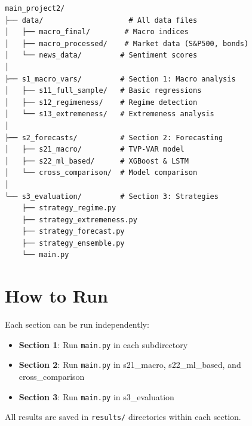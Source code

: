 \documentclass[11pt,a4paper]{article}
\begin{document}
\begin{verbatim}
main_project2/
├── data/                    # All data files
│   ├── macro_final/        # Macro indices
│   ├── macro_processed/    # Market data (S&P500, bonds)
│   └── news_data/         # Sentiment scores
│
├── s1_macro_vars/         # Section 1: Macro analysis
│   ├── s11_full_sample/   # Basic regressions
│   ├── s12_regimeness/    # Regime detection
│   └── s13_extremeness/   # Extremeness analysis
│
├── s2_forecasts/          # Section 2: Forecasting
│   ├── s21_macro/         # TVP-VAR model
│   ├── s22_ml_based/      # XGBoost & LSTM
│   └── cross_comparison/  # Model comparison
│
└── s3_evaluation/         # Section 3: Strategies
    ├── strategy_regime.py
    ├── strategy_extremeness.py
    ├── strategy_forecast.py
    ├── strategy_ensemble.py
    └── main.py
\end{verbatim}

\section{How to Run}

Each section can be run independently:

\begin{itemize}
    \item \textbf{Section 1}: Run \texttt{main.py} in each subdirectory
    \item \textbf{Section 2}: Run \texttt{main.py} in s21\_macro, s22\_ml\_based, and cross\_comparison
    \item \textbf{Section 3}: Run \texttt{main.py} in s3\_evaluation
\end{itemize}

All results are saved in \texttt{results/} directories within each section.
\end{document}

